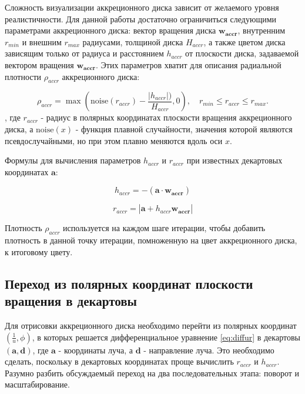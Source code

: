 Сложность визуализации аккреционного диска зависит от желаемого уровня реалистичности. Для данной работы достаточно ограничиться следующими параметрами аккреционного диска: вектор вращения диска $\mathbf{w_{accr}}$, внутренним $r_{min}$ и внешним $r_{max}$ радиусами, толщиной диска $H_{accr}$, а также цветом диска зависящим только от радиуса и расстоянием $h_{accr}$ от плоскости диска, задаваемой вектором вращения $\mathbf{w_{accr}}$. Этих параметров хватит для описания радиальной плотности $\rho_{accr}$ аккреционного диска:

\begin{equation}
\label{eq:accr_disk}
    \rho_{accr} = \max{\left(\text{noise}(r_{accr}) - \frac{\left|h_{accr}\right|)}{H_{accr}}, 0\right)},
    \quad
    r_{min} \le r_{accr} \le r_{max}.
\end{equation}
, где $r_{accr}$ - радиус в полярных координатах плоскости вращения аккреционного диска, а $\text{noise}(x)$ - функция плавной случайности, значения которой являются псевдослучайными, но при этом плавно меняются вдоль оси $x$.

Формулы для вычисления параметров $h_{accr}$ и $r_{accr}$ при известных декартовых координатах $\mathbf{a}$:

\begin{equation}
\label{eq:h_accr}
    h_{accr} = -\left(\mathbf{a} \cdot \mathbf{w_{accr}}\right)
\end{equation}

\begin{equation}
\label{eq:r_accr}
    r_{accr} = \left|\mathbf{a} + h_{accr}\mathbf{w_{accr}}\right|
\end{equation}

Плотность $\rho_{accr}$ используется на каждом шаге итерации, чтобы добавить плотность в данной точку итерации, помноженную на цвет аккреционного диска, к итоговому цвету.

\subsection{Переход из полярных координат плоскости вращения в декартовы}
\label{subsec:transition_from_polar_to_decart}

Для отрисовки аккреционного диска необходимо перейти из полярных координат $\left(\frac{1}{u}, \phi\right)$, в которых решается дифференциальное уравнение \eqref{eq:diffur} в декартовы $\left(\mathbf{a}, \mathbf{d}\right)$, где $\mathbf{a}$ - координаты луча, а $\mathbf{d}$ - направление луча. Это необходимо сделать, поскольку в декартовых координатах проще вычислить $r_{accr}$ и $h_{accr}$. Разумно разбить обсуждаемый переход на два последовательных этапа: поворот и масштабирование.

